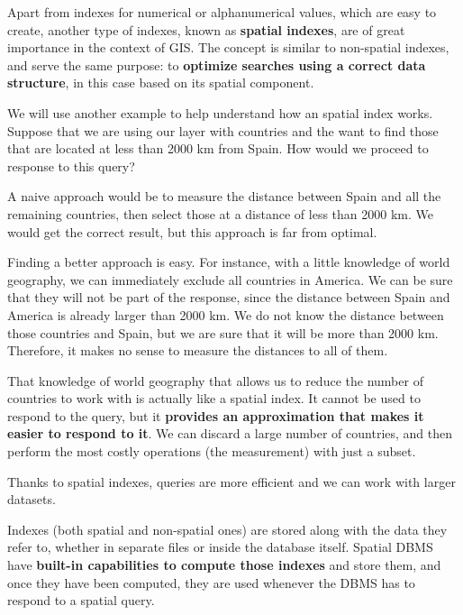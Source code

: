 Apart from indexes for numerical or alphanumerical values, which are easy to create, another type of indexes, known as \textbf{spatial indexes}, are of great importance in the context of GIS. The concept is similar to non-spatial indexes, and serve the same purpose: to \textbf{optimize searches using a correct data structure}, in this case based on its spatial component.

We will use another example to help understand how an spatial index works. Suppose that we are using our layer with countries and the want to find those that are located at less than 2000 km from Spain. How would we proceed to response to this query? 

A naive approach would be to measure the distance between Spain and all the remaining countries, then select those at a distance of less than 2000 km. We would get the correct result, but this approach is far from optimal. 

Finding a better approach is easy. For instance, with a little knowledge of world geography, we can immediately exclude all countries in America. We can be sure that they will not be part of the response, since the distance between Spain and America is already larger than 2000 km. We do not know the distance between those countries and Spain, but we are sure that it will be more than 2000 km. Therefore, it makes no sense to measure the distances to all of them.

That knowledge of world geography that allows us to reduce the number of countries to work with is actually like a spatial index. It cannot be used to respond to the query, but it \textbf{provides an approximation that makes it easier to respond to it}. We can discard a large number of countries, and then perform the most costly operations (the measurement) with just a subset.

Thanks to spatial indexes, queries are more efficient and we can work with larger datasets.

Indexes (both spatial and non-spatial ones) are stored along with the data they refer to, whether in separate files or inside the database itself. Spatial DBMS have \textbf{built-in capabilities to compute those indexes} and store them, and once they have been computed, they are used whenever the DBMS has to respond to a spatial query.


\pagestyle{empty}
